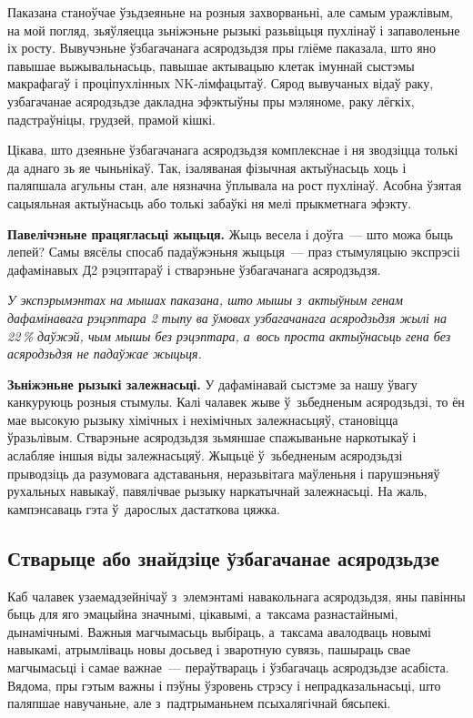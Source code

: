 Паказана станоўчае ўзьдзеяньне на розныя захворваньні, але самым уражлівым, на мой погляд, зьяўляецца зьніжэньне рызыкі разьвіцьця пухлінаў і запаволеньне іх росту. Вывучэньне ўзбагачанага асяродзьдзя пры гліёме паказала, што яно павышае выжывальнасьць, павышае актывацыю клетак імуннай сыстэмы макрафагаў і проціпухлінных NK-лімфацытаў. Сярод вывучаных відаў раку, узбагачанае асяродзьдзе дакладна эфэктыўны пры мэляноме, раку лёгкіх, падстраўніцы, грудзей, прамой кішкі. 


Цікава, што дзеяньне ўзбагачанага асяродзьдзя комплекснае і ня зводзіцца толькі да аднаго зь яе чыньнікаў. Так, ізаляваная фізычная актыўнасьць хоць і паляпшала агульны стан, але нязначна ўплывала на рост пухлінаў. Асобна ўзятая сацыяльная актыўнасьць або толькі забаўкі ня мелі прыкметнага эфэкту. 

\textbf{Павелічэньне працягласьці жыцьця.} Жыць весела і доўга~--- што можа быць лепей? Самы вясёлы спосаб падаўжэньня жыцьця~--- праз стымуляцыю экспрэсіі дафамінавых Д2 рэцэптараў і стварэньне ўзбагачанага асяродзьдзя.

\emph{У экспэрымэнтах на мышах паказана, што мышы з~актыўным генам дафамінавага рэцэптара 2 тыпу ва ўмовах узбагачанага асяродзьдзя жылі на 22\,\% даўжэй, чым мышы без рэцэптара, а~вось проста актыўнасьць гена без асяродзьдзя не падаўжае жыцьця.} 

\textbf{Зьніжэньне рызыкі залежнасьці.} У дафамінавай сыстэме за нашу ўвагу канкуруюць розныя стымулы. Калі чалавек жыве ў~зьбедненым асяродзьдзі, то ён мае высокую рызыку хімічных і нехімічных залежнасьцяў, становіцца ўразьлівым. Стварэньне асяродзьдзя зьмяншае спажываньне наркотыкаў і аслабляе іншыя віды залежнасьцяў. Жыцьцё ў~зьбедненым асяродзьдзі прыводзіць да разумовага адставаньня, неразьвітага маўленьня і парушэньняў рухальных навыкаў, павялічвае рызыку наркатычнай залежнасьці. На жаль, кампэнсаваць гэта ў~дарослых дастаткова цяжка.

\subsection*{Стварыце або знайдзіце ўзбагачанае асяродзьдзе}

Каб чалавек узаемадзейнічаў з~элемэнтамі навакольнага асяродзьдзя, яны павінны быць для яго эмацыйна значнымі, цікавымі, а~таксама разнастайнымі, дынамічнымі. Важныя магчымасьць выбіраць, а~таксама авалодваць новымі навыкамі, атрымліваць новы досьвед і зваротную сувязь, пашыраць свае магчымасьці і самае важнае~--- пераўтвараць і ўзбагачаць асяродзьдзе асабіста. Вядома, пры гэтым важны і пэўны ўзровень стрэсу і непрадказальнасьці, што паляпшае навучаньне, але з~падтрыманьнем псыхалягічнай бясьпекі. 

